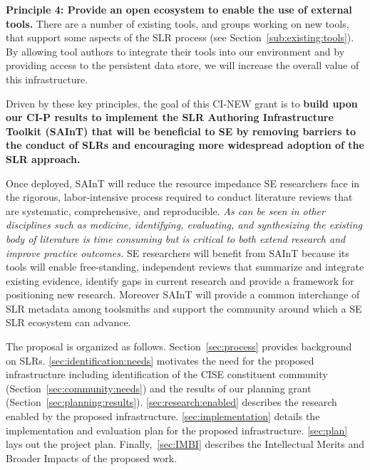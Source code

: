 \textbf{Principle 4: Provide an open ecosystem to enable the use of external tools.}
There are a number of existing tools, and groups working on new tools, that support some aspects of the SLR process (see Section~\ref{sub:existing:tools}).
By allowing tool authors to integrate their tools into our environment and by providing access to the persistent data store, we will increase the overall value of this infrastructure.

Driven by these key principles, the goal of this CI-NEW grant is to \textbf{build upon our CI-P results to implement the SLR Authoring Infrastructure Toolkit (SAInT) that will be beneficial to SE by removing barriers to the conduct of SLRs and encouraging more widespread adoption of the SLR approach.}

Once deployed, SAInT will reduce the resource impedance SE researchers face in the rigorous, labor-intensive process required to conduct literature reviews that are systematic, comprehensive, and reproducible.  
\textit{As can be seen in other disciplines such as medicine, identifying, evaluating, and synthesizing the existing body of literature is time consuming but is critical to both extend research and improve practice outcomes.}
SE researchers will benefit from SAInT because its tools will enable free-standing, independent reviews that summarize and integrate existing evidence, identify gaps in current research and provide a framework for positioning new research. 
Moreover SAInT will provide a common interchange of SLR metadata among toolsmiths and support the community around which a SE SLR ecosystem can advance.

The proposal is organized as follows. 
Section~\ref{sec:process} provides background on SLRs.
\ref{sec:identification:needs} motivates the need for the proposed infrastructure including identification of the CISE constituent community (Section~\ref{sec:community:needs}) and the results of our planning grant (Section~\ref{sec:planning:results}).
\ref{sec:research:enabled} describes the research enabled by the proposed infrastructure. 
\ref{sec:implementation} details the implementation and evaluation plan for the proposed infrastructure. 
\ref{sec:plan} lays out the project plan. 
Finally,~\ref{sec:IMBI} describes the Intellectual Merits and Broader Impacts of the proposed work.
